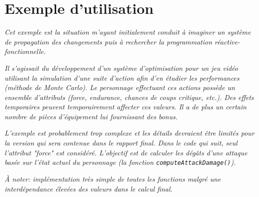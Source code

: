 \section{Exemple d'utilisation}
\textit{Cet exemple est la situation m'ayant initialement conduit à imaginer un système de propagation des changements puis à rechercher la programmation réactive-fonctionnelle.}

\textit{Il s'agissait du développement d'un système d'optimisation pour un jeu vidéo utilisant la simulation d'une suite d'action afin d'en étudier les performances (méthode de Monte Carlo). Le personnage effectuant ces actions possède un ensemble d'attributs (force, endurance, chances de coups critique, etc.). Des effets temporaires peuvent temporairement affecter ces valeurs. Il a de plus un certain nombre de pièces d'équipement lui fournissant des bonus.}

\textit{L'exemple est probablement trop complexe et les détails devraient être limités pour la version qui sera contenue dans le rapport final. Dans le code qui suit, seul l'attribut "force" est considéré. L'objectif est de calculer les dégâts d'une attaque basée sur l'état actuel du personnage (la fonction \texttt{computeAttackDamage()}).}

\textit{À noter: implémentation très simple de toutes les fonctions malgré une interdépendance élevées des valeurs dans le calcul final.}

